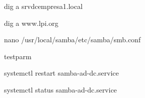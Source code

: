 dig a srvdcempresa1.local

dig a www.lpi.org

nano /usr/local/samba/etc/samba/smb.conf

testparm

systemctl restart samba-ad-dc.service

systemctl status samba-ad-dc.service